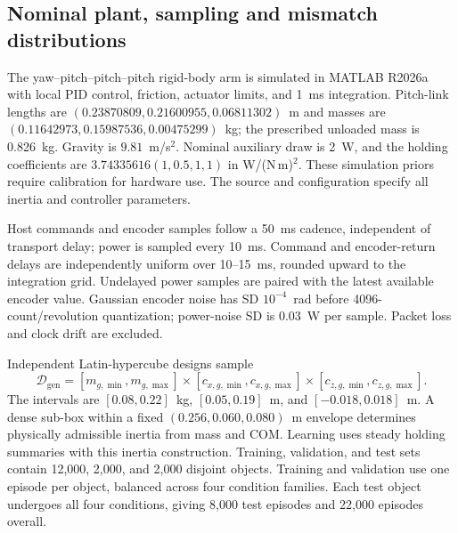 \documentclass[12pt,a4paper]{article}
\begin{document}
\subsection{Nominal plant, sampling and mismatch distributions}
The yaw--pitch--pitch--pitch rigid-body arm is simulated in MATLAB R2026a
with local PID control, friction, actuator limits, and 1~ms integration.
Pitch-link lengths are
$(0.23870809,\allowbreak 0.21600955,\allowbreak 0.06811302)$~m and
masses are $(0.11642973,\allowbreak 0.15987536,\allowbreak 0.00475299)$~kg;
the prescribed unloaded mass is 0.826~kg. Gravity is $9.81$~m/s$^2$.
Nominal auxiliary draw is 2~W, and the holding coefficients are
$3.74335616(1,0.5,1,1)$ in W/(N\,m)$^2$. These simulation priors require
calibration for hardware use. The source and configuration specify all
inertia and controller parameters.

Host commands and encoder samples follow a 50~ms cadence, independent of
transport delay; power is sampled every 10~ms. Command and encoder-return
delays are independently uniform over 10--15~ms, rounded upward to the
integration grid. Undelayed power samples are paired with the latest
available encoder value. Gaussian encoder noise has SD $10^{-4}$~rad
before 4096-count/revolution quantization; power-noise SD is 0.03~W per
sample. Packet loss and clock drift are excluded.

Independent Latin-hypercube designs sample
\begin{equation}
 \mathcal D_{\mathrm{gen}}=[m_{g,\min},m_{g,\max}]
 \times[c_{x,g,\min},c_{x,g,\max}]
 \times[c_{z,g,\min},c_{z,g,\max}].
 \label{eq:generation_domain}
\end{equation}
The intervals are $[0.08,0.22]$~kg, $[0.05,0.19]$~m, and
$[-0.018,0.018]$~m. A dense sub-box within a fixed
$(0.256,0.060,0.080)$~m envelope determines physically admissible inertia
from mass and COM. Learning uses steady holding summaries with this inertia
construction. Training, validation, and test sets contain 12,000, 2,000,
and 2,000 disjoint objects. Training and validation use one episode per
object, balanced across four condition families. Each test object
undergoes all four conditions, giving 8,000 test episodes and 22,000
episodes overall.
\end{document}
